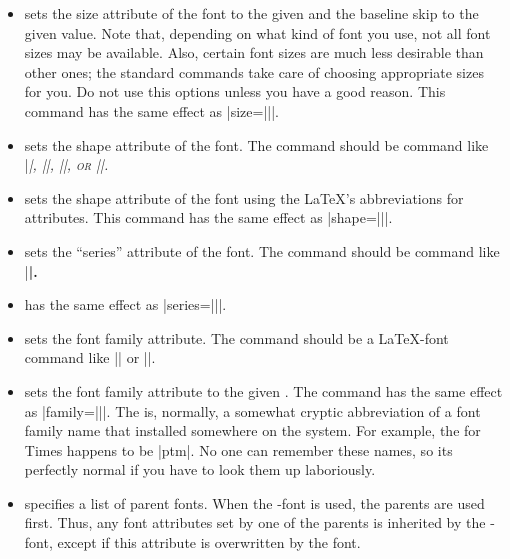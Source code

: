 \begin{command}{\setbeamerfont\opt{|*|}}
\begin{itemize}
    Note that there is a different between
    specifying and empty command and specifying |\normalsize|: Making
    the size attribute ``empty'' means that the font size should not
    be changed when this font is used, while specifying |\normalsize|
    means that the size should be set to the normal size whenever this
    font is used.
  \item {} sets
    the size attribute of   the font to the given 
    and the baseline skip to the given value. Note that, depending on
    what  kind of font you use, not  all font sizes may be
    available. Also,  certain font sizes are much less desirable than
    other ones; the standard commands take care of choosing
    appropriate sizes for you. Do not use this options unless you have
    a good reason. This command has the same effect as
    |size={\fontsize||}|.
  \item {} sets the shape
    attribute of the font. The command should be command like
    |\itshape|, |\slshape|, |\scshape|, or |\upshape|.
  \item {} sets
    the shape attribute of the font using the \LaTeX's abbreviations
    for attributes. This command has the same effect as
    |shape={\fontshape||}|.
  \item {} sets the ``series''
    attribute of the font. The command should be command like
    |\bfseries|.
  \item {} has
    the same effect as |series={\fontseries||}|.
  \item {} sets the font family
    attribute. The command should be a \LaTeX-font command like
    |\rmfamily| or |\sffamily|.
  \item {} sets the font family
    attribute to the given . The command has the
    same effect as |family={\fontfamily||}|. The
     is, normally, a somewhat cryptic abbreviation
    of a font family name that installed somewhere on the system. For
    example, the  for Times happens to be
    |ptm|. No one can remember these names, so its perfectly normal if
    you have to look them up laboriously.
  \item {} specifies a list of
    parent fonts. When the \beamer-font is used, the parents are used
    first. Thus, any font attributes set by one of the parents is
    inherited by the \beamer-font, except if this attribute is
    overwritten by the font.
  \end{itemize}


\end{command}
